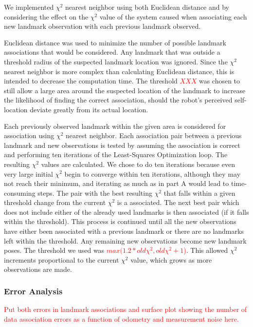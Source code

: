 \documentclass[12pt]{article}
\begin{document}
We implemented $\chi^2$ nearest neighbor using both Euclidean distance and by considering the effect on the $\chi^2$ value of the system caused when associating each new landmark observation with each previous landmark observed.  

Euclidean distance was used to minimize the number of possible landmark associations that would be considered.  Any landmark that was outside a threshold radius of the suspected landmark location was ignored.  Since the $\chi^2$ nearest neighbor is more complex than calculating Euclidean distance, this is intended to decrease the computation time.  The threshold \textcolor{red}{$XXX$} was chosen to still allow a large area around the suspected location of the landmark to increase the likelihood of finding the correct association, should the robot's perceived self-location deviate greatly from its actual location.

Each previously observed landmark within the given area is considered for association using $\chi^2$ nearest neighbor.  Each association pair between a previous landmark and new observations is tested by assuming the association is correct and performing ten iterations of the Least-Squares Optimization loop.  The resulting $\chi^2$ values are calculated.  We chose to do ten iterations because even very large initial $\chi^2$ begin to converge within ten iterations, although they may not reach their minimum, and iterating as much as in part A would lead to time-consuming steps.  The pair with the best resulting $\chi^2$ that falls within a given threshold change from the current $\chi^2$ is a associated.  The next best pair which does not include either of the already used landmarks is then associated (if it falls within the threshold).  This process is continued until all the new observations have either been associated with a previous landmark or there are no landmarks left within the threshold.  Any remaining new observations become new landmark poses.  The threshold we used was \textcolor{red}{$max(1.2*old\chi^2, old\chi^2 + 1$)}.  This allowed $\chi^2$ increments proportional to the current $\chi^2$ value, which grows as more observations are made.


\subsubsection*{Error Analysis}

\textcolor{red}{Put both errors in landmark associations and surface plot showing the number of data association errors as a function of odometry and measurement noise here.}
\end{document}
